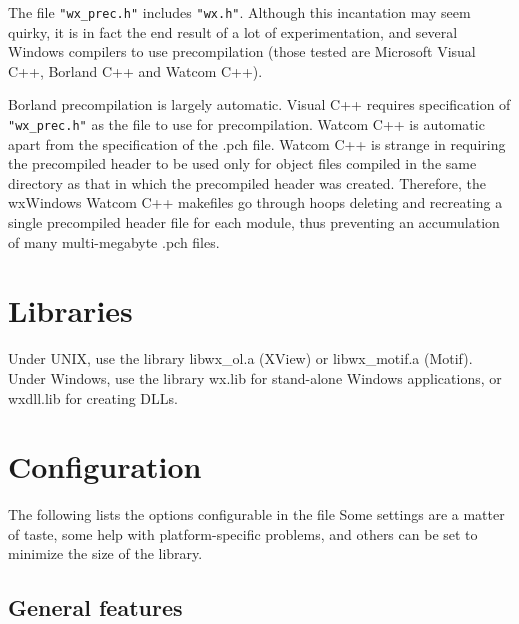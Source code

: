 The file {\tt "wx\_prec.h"} includes {\tt "wx.h"}. Although this incantation
may seem quirky, it is in fact the end result of a lot of experimentation,
and several Windows compilers to use precompilation (those tested are Microsoft Visual C++, Borland C++
and Watcom C++).

Borland precompilation is largely automatic. Visual C++ requires specification of {\tt "wx\_prec.h"} as
the file to use for precompilation. Watcom C++ is automatic apart from the specification of
the .pch file. Watcom C++ is strange in requiring the precompiled header to be used only for
object files compiled in the same directory as that in which the precompiled header was created.
Therefore, the wxWindows Watcom C++ makefiles go through hoops deleting and recreating
a single precompiled header file for each module, thus preventing an accumulation of many
multi-megabyte .pch files.

\section{Libraries}

Under UNIX, use the library libwx\_ol.a (XView) or libwx\_motif.a
(Motif).  Under Windows, use the library wx.lib for stand-alone Windows
applications, or wxdll.lib for creating DLLs.

\section{Configuration}

The following lists the options configurable in the file
 Some settings are a matter
of taste, some help with platform-specific problems, and
others can be set to minimize the size of the library.

\subsection{General features}

